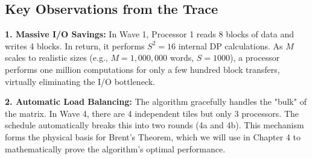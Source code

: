 \subsection{Key Observations from the Trace}
\textbf{1. Massive I/O Savings:} In Wave 1, Processor 1 reads 8 blocks of data and writes 4 blocks. In return, it performs $S^2 = 16$ internal DP calculations. As $M$ scales to realistic sizes (e.g., $M = 1,000,000$ words, $S=1000$), a processor performs one million computations for only a few hundred block transfers, virtually eliminating the I/O bottleneck.

\textbf{2. Automatic Load Balancing:} The algorithm gracefully handles the "bulk" of the matrix. In Wave 4, there are 4 independent tiles but only 3 processors. The schedule automatically breaks this into two rounds (4a and 4b). This mechanism forms the physical basis for Brent's Theorem, which we will use in Chapter 4 to mathematically prove the algorithm's optimal performance.
